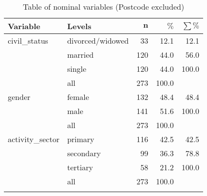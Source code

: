 {\footnotesize
\begin{longtable}{llrrr}
\caption{Table of nominal variables (Postcode excluded)} \\ 
 \textbf{Variable} & \textbf{Levels} & $\mathbf{n}$ & $\mathbf{\%}$ & $\mathbf{\sum \%}$ \\ 
  \hline
civil\_status & divorced/widowed & 33 & 12.1 & 12.1 \\ 
   & married & 120 & 44.0 & 56.0 \\ 
   & single & 120 & 44.0 & 100.0 \\ 
   \hline
 & all & 273 & 100.0 &  \\ 
   \hline
\hline
gender & female & 132 & 48.4 & 48.4 \\ 
   & male & 141 & 51.6 & 100.0 \\ 
   \hline
 & all & 273 & 100.0 &  \\ 
   \hline
\hline
activity\_sector & primary & 116 & 42.5 & 42.5 \\ 
   & secondary & 99 & 36.3 & 78.8 \\ 
   & tertiary & 58 & 21.2 & 100.0 \\ 
   \hline
 & all & 273 & 100.0 &  \\ 
   \hline
\hline
\hline
\label{tab:table5}
\end{longtable}
}
